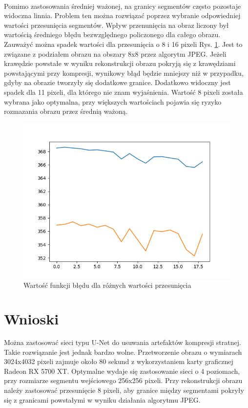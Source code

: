 \documentclass[a4paper, 12pt]{article}
\begin{document}
\\
Pomimo zastosowania średniej ważonej, na granicy segmentów często pozostaje widoczna linnia.
Problem ten można rozwiązać poprzez wybranie odpowiedniej wartości przesunięcia segmentów.
Wpływ przenunięcia na obraz liczony był wartością średniego błędu bezwzględnego policzonego dla całego obrazu.
Zauważyć można spadek wartości dla przesunięcia o 8 i 16 pixeli Rys. \ref{fig:overlap_and_loss}.
Jest to związane z podziałem obrazu na obszary 8x8 przez algorytm JPEG.
Jeżeli krawędzie powstałe w wyniku rekonstrukcji obrazu pokryją się z krawędziami powstającymi przy kompresji,
wynikowy błąd będzie mniejszy niż w przypadku, gdyby na obrazie tworzyły się dodatkowe granice.
Dodatkowo widoczny jest spadek dla 11 pixeli, dla którego nie znam wyjaśnienia.
Wartość 8 pixeli została wybrana jako optymalna, przy większych wartościach pojawia się ryzyko rozmazania obrazu przez średnią ważoną.
\newpage
\begin{figure}[h!]
\begin{center}
	\includegraphics[width=0.7\columnwidth]{overlap_and_loss.png}
	\caption{Wartość funkcji błędu dla różnych wartości przesunięcia}
	\label{fig:overlap_and_loss}
\end{center}
\end{figure}
\section{Wnioski}
Można zastosować sieci typu U-Net do usuwania artefaktów kompresji stratnej.
Takie rozwiązanie jest jednak bardzo wolne. Przetworzenie obrazu o wymiarach 3024x4032 pixeli zajmuje około 80 sekund z wykorzystaniem karty graficznej Radeon RX 5700 XT.
Optymalne wydaje się zastosowanie sieci o 4 poziomach, przy rozmiarze segmentu wejściowego 256x256 pixeli.
Przy rekonstrukcji obrazu należy zastosować przesunięcie 8 pixeli,
aby granice między segmentami pokryły się z granicami powstałymi w wyniku działania algorytmu JPEG.



\end{document}
